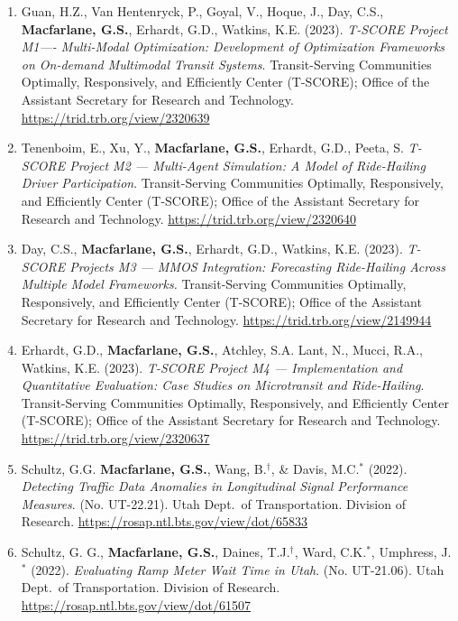 \documentclass[margin,line]{res}
\newcounter{enuminitialize}
\newenvironment{myenum}[1][]
{%
 \setcounter{enuminitialize}{#1}
 \addtocounter{enuminitialize}{2}
 \begin{enumerate}[left= 4pt, itemsep=8pt, start=\value{enuminitialize}, label=\arabic*\addtocounter{enumi}{-2}]
}
{%
 \end{enumerate}
}
\begin{document}
\begin{resume}
\begin{myenum}[18]
\item Guan, H.Z., Van Hentenryck, P., Goyal, V., Hoque, J., Day, C.S., \textbf{Macfarlane, G.S.}, Erhardt, G.D., Watkins, K.E. (2023). \textit{T-SCORE Project M1---- Multi-Modal Optimization: Development of Optimization Frameworks on On-demand Multimodal Transit Systems}.  Transit-Serving Communities Optimally, Responsively, and Efficiently Center (T-SCORE); Office of the Assistant Secretary for Research and Technology.  \url{https://trid.trb.org/view/2320639}

\item Tenenboim, E., Xu, Y.,  \textbf{Macfarlane, G.S.},  Erhardt, G.D., Peeta, S. \textit{T-SCORE Project M2 --- Multi-Agent Simulation: A Model of Ride-Hailing Driver Participation}.  Transit-Serving Communities Optimally, Responsively, and Efficiently Center (T-SCORE); Office of the Assistant Secretary for Research and Technology. \url{https://trid.trb.org/view/2320640}

\item Day, C.S., \textbf{Macfarlane, G.S.}, Erhardt, G.D., Watkins, K.E. (2023). \textit{T-SCORE Projects M3 --- MMOS Integration: Forecasting Ride-Hailing Across Multiple Model Frameworks.} Transit-Serving Communities Optimally, Responsively, and Efficiently Center (T-SCORE); Office of the Assistant Secretary for Research and Technology. \url{https://trid.trb.org/view/2149944}

\item Erhardt, G.D., \textbf{Macfarlane, G.S.}, Atchley, S.A. Lant, N., Mucci, R.A., Watkins, K.E. (2023). \textit{T-SCORE Project M4 --- Implementation and Quantitative Evaluation: Case Studies on Microtransit and Ride-Hailing}. Transit-Serving Communities Optimally, Responsively, and Efficiently Center (T-SCORE); Office of the Assistant Secretary for Research and Technology. \url{https://trid.trb.org/view/2320637}


\item Schultz, G.G. \textbf{Macfarlane, G.S.}, Wang, B.$^\dagger$, \& Davis,
  M.C.$^*$ (2022). \textit{Detecting Traffic Data Anomalies in Longitudinal Signal
  Performance Measures}. (No. UT-22.21). Utah Dept.\ of Transportation. Division of
  Research. \url{https://rosap.ntl.bts.gov/view/dot/65833}

\item Schultz, G. G., \textbf{Macfarlane, G.S.}, Daines, T.J.$^\dagger$, Ward,
  C.K.$^*$, Umphress, J.$^*$ (2022). \textit{Evaluating Ramp Meter Wait Time in
  Utah}. (No. UT-21.06). Utah Dept.\ of Transportation. Division of Research.
  \url{https://rosap.ntl.bts.gov/view/dot/61507}



\end{myenum}
\end{resume}
\end{document}

